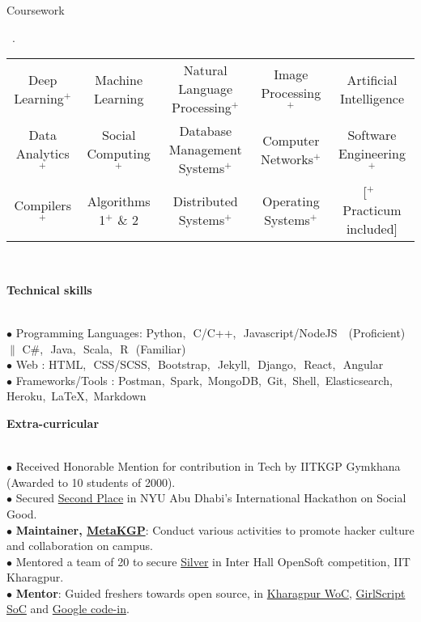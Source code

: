\documentclass[11pt, a4paper]{resume}
\newcommand{\important}[1]{
	\textcolor{mypurple}{#1}
}
\newcommand{\fillit}[1]{
	\leavevmode\xleaders\hbox{#1}\hfill\kern0pt
}
\newcommand{\sectionTitle}[1]{
	\begin{Large}
    	\important{\textbf{#1}} 
    \end{Large}
    \important{\rlap{\rule[.5ex]{\linegoal}{0.5pt}}{}}
     \vspace{0.1em}\\
}
\newcommand{\sectionSubtitleX}[1]{
	\begin{large}
    \important{#1}
    \end{large}
    \fillit{\important{.}}
}
\begin{document}
\sectionSubtitleX{Coursework} 
\begin{tabular}{>{\footnotesize}c>{\footnotesize}c>{\footnotesize}c>{\footnotesize}c>{\footnotesize}c}
Deep Learning$^+$ & Machine Learning & Natural Language Processing$^+$ & Image Processing$^+$ & Artificial Intelligence \\
Data Analytics$^+$ & Social Computing$^+$ & Database Management Systems$^+$ & Computer Networks$^+$ & Software Engineering$^+$ \\
Compilers$^+$ & Algorithms 1$^+$ \& 2 & Distributed Systems$^+$ & Operating Systems$^+$ & {\scriptsize \,[$^+$ \,\,Practicum included]} \\
\end{tabular}\\

\sectionTitle{Technical skills}
$\bullet$ Programming Languages: Python,\,\, C/C++,\,\, Javascript/NodeJS \,\, (Proficient)\,\, $\|$ C\#,\,\, Java,\,\, Scala,\,\, R\,\, (Familiar) \\
$\bullet$ Web : HTML,\,\,  CSS/SCSS,\,\,  Bootstrap,\,\,  Jekyll,\,\,  Django,\,\,  React,\,\,  Angular \\
$\bullet$  Frameworks/Tools
: Postman,\, Spark,\, MongoDB,\, Git,\, Shell,\, Elasticsearch,\, Heroku,\, LaTeX,\, Markdown\,

\sectionTitle{Extra-curricular}
$\bullet$ Received Honorable Mention for contribution in Tech by IITKGP Gymkhana (Awarded to 10 students of 2000).\\
$\bullet$ Secured \href{https://sites.nyuad.nyu.edu/hackathon/}{Second Place} in NYU Abu Dhabi's International Hackathon on Social Good.\\
$\bullet$ {\bf Maintainer, \href{http://metakgp.github.io}{MetaKGP}}: Conduct various activities to promote hacker culture and collaboration on campus.\\
$\bullet$ Mentored a team of 20 to secure \href{}{Silver} in Inter Hall OpenSoft competition, IIT Kharagpur.\\
$\bullet$ {\bf Mentor}: Guided freshers towards open source, in \href{https://kwoc.kossiitkgp.in/}{Kharagpur WoC},  \href{https://gssoc.tech/projects.html#facebook-archive}{GirlScript SoC} and  \href{https://drive.google.com/open?id=1b1xN6dxnPMP9vKaUW6zxeE__70iP1AgJ}{Google code-in}. \\
\end{document}
